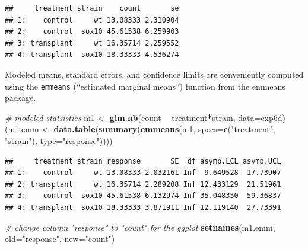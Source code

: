 \documentclass[]{book}
\newenvironment{Shaded}{\begin{snugshade}}{\end{snugshade}}
\newcommand{\CommentTok}[1]{\textcolor[rgb]{0.56,0.35,0.01}{\textit{#1}}}
\newcommand{\DataTypeTok}[1]{\textcolor[rgb]{0.13,0.29,0.53}{#1}}
\newcommand{\KeywordTok}[1]{\textcolor[rgb]{0.13,0.29,0.53}{\textbf{#1}}}
\newcommand{\NormalTok}[1]{#1}
\newcommand{\OperatorTok}[1]{\textcolor[rgb]{0.81,0.36,0.00}{\textbf{#1}}}
\newcommand{\StringTok}[1]{\textcolor[rgb]{0.31,0.60,0.02}{#1}}
\begin{document}
\begin{verbatim}
##     treatment strain    count       se
## 1:    control     wt 13.08333 2.310904
## 2:    control  sox10 45.61538 6.259903
## 3: transplant     wt 16.35714 2.259552
## 4: transplant  sox10 18.33333 4.536274
\end{verbatim}

Modeled means, standard errors, and confidence limits are conveniently computed using the \texttt{emmeans} (``estimated marginal means'') function from the emmeans package.

\begin{Shaded}
\begin{Highlighting}[]
\CommentTok{# modeled statsistics}
\NormalTok{m1 <-}\StringTok{ }\KeywordTok{glm.nb}\NormalTok{(count }\OperatorTok{~}\StringTok{ }\NormalTok{treatment}\OperatorTok{*}\NormalTok{strain, }\DataTypeTok{data=}\NormalTok{exp6d)}
\NormalTok{(m1.emm <-}\StringTok{ }\KeywordTok{data.table}\NormalTok{(}\KeywordTok{summary}\NormalTok{(}\KeywordTok{emmeans}\NormalTok{(m1, }\DataTypeTok{specs=}\KeywordTok{c}\NormalTok{(}\StringTok{"treatment"}\NormalTok{, }\StringTok{"strain"}\NormalTok{), }\DataTypeTok{type=}\StringTok{"response"}\NormalTok{))))}
\end{Highlighting}
\end{Shaded}

\begin{verbatim}
##     treatment strain response       SE  df asymp.LCL asymp.UCL
## 1:    control     wt 13.08333 2.032161 Inf  9.649528  17.73907
## 2: transplant     wt 16.35714 2.289208 Inf 12.433129  21.51961
## 3:    control  sox10 45.61538 6.132974 Inf 35.048350  59.36837
## 4: transplant  sox10 18.33333 3.871911 Inf 12.119140  27.73391
\end{verbatim}

\begin{Shaded}
\begin{Highlighting}[]
\CommentTok{# change column "response" to "count" for the ggplot}
\KeywordTok{setnames}\NormalTok{(m1.emm, }\DataTypeTok{old=}\StringTok{"response"}\NormalTok{, }\DataTypeTok{new=}\StringTok{"count"}\NormalTok{)}
\end{Highlighting}
\end{Shaded}
\end{document}
